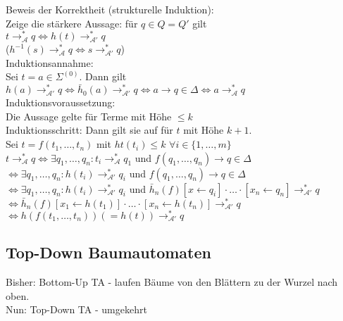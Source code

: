 \documentclass[titlepage]{article}
\begin{document}
Beweis der Korrektheit (strukturelle Induktion):\\
Zeige die st\"arkere Aussage: f\"ur $q \in Q = Q'$ gilt \\
$t \to_\mathcal{A}^\ast q \Leftrightarrow h(t) \to_{\mathcal{A}'}^\ast q$\\
($h^{-1}(s) \to_\mathcal{A}^\ast q \Leftrightarrow s \to_{\mathcal{A}'}^\ast q$)\\

Induktionsannahme:\\
Sei $t = a \in \Sigma^{(0)}$. Dann gilt
$h(a) \to_{\mathcal{A}'}^\ast q \Leftrightarrow
\bar{h}_0(a) \to_{\mathcal{A}'}^\ast q \Leftrightarrow
a \to q \in \Delta \Leftrightarrow a \to_\mathcal{A}^\ast q$\\

Induktionsvoraussetzung:\\
Die Aussage gelte f\"ur Terme mit H\"ohe $\leq k$\\

Induktionsschritt: Dann gilt sie auf f\"ur $t$ mit H\"ohe $k+1$.\\
Sei $t = f(t_1, \dots, t_n)$ mit $ht(t_i) \leq k$ $\forall i \in \{1, \dots, m\}$\\

$t \to_\mathcal{A}^\ast q \Leftrightarrow \exists q_1, \dots, q_n: t_i \to_\mathcal{A}^\ast q_1$
und $f(q_1, \dots, q_n) \to q \in \Delta$\\
$\Leftrightarrow \exists q_1, \dots, q_n: h(t_i) \to_{\mathcal{A}'}^\ast q_i$ und
$f(q_1, \dots, q_n) \to q \in \Delta$ \\
$\Leftrightarrow \exists q_1, \dots, q_n: h(t_i) \to_{\mathcal{A}'}^\ast q_i$ und
$\bar{h}_n(f)[x \leftarrow q_i] \cdot \dots \cdot [x_n \leftarrow q_n] \to_{\mathcal{A}'}^\ast q$\\
$\Leftrightarrow \bar{h}_n(f)[x_1 \leftarrow h(t_1)] \cdot \dots \cdot 
[x_n \leftarrow h(t_n)] \to_{\mathcal{A}'}^\ast q$\\
$\Leftrightarrow h(f(t_1, \dots, t_n)) (=h(t)) \to_{\mathcal{A}'}^\ast q$

\subsection{Top-Down Baumautomaten}

Bisher: Bottom-Up TA - laufen B\"aume von den Bl\"attern zu der Wurzel nach oben.\\
Nun: Top-Down TA - umgekehrt\\
\end{document}
